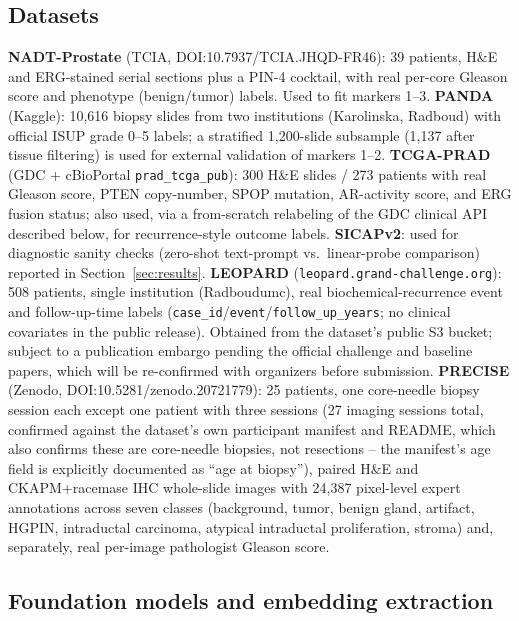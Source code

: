 \subsection{Datasets}

\textbf{NADT-Prostate} (TCIA, DOI:10.7937/TCIA.JHQD-FR46): 39 patients, H\&E and ERG-stained
serial sections plus a PIN-4 cocktail, with real per-core Gleason score and phenotype
(benign/tumor) labels. Used to fit markers 1--3.
\textbf{PANDA} (Kaggle): 10{,}616 biopsy slides from two institutions (Karolinska, Radboud)
with official ISUP grade 0--5 labels; a stratified 1{,}200-slide subsample (1{,}137 after
tissue filtering) is used for external validation of markers 1--2.
\textbf{TCGA-PRAD} (GDC + cBioPortal \texttt{prad\_tcga\_pub}): 300 H\&E slides / 273 patients
with real Gleason score, PTEN copy-number, SPOP mutation, AR-activity score, and ERG fusion
status; also used, via a from-scratch relabeling of the GDC clinical API described below, for
recurrence-style outcome labels.
\textbf{SICAPv2}: used for diagnostic sanity checks (zero-shot text-prompt vs.\ linear-probe
comparison) reported in Section~\ref{sec:results}.
\textbf{LEOPARD} (\texttt{leopard.grand-challenge.org}): 508 patients, single institution
(Radboudumc), real biochemical-recurrence event and follow-up-time labels
(\texttt{case\_id}/\texttt{event}/\texttt{follow\_up\_years}; no clinical covariates in the
public release). Obtained from the dataset's public S3 bucket; subject to a publication
embargo pending the official challenge and baseline papers, which will be re-confirmed with
organizers before submission.
\textbf{PRECISE} (Zenodo, DOI:10.5281/zenodo.20721779): 25 patients, one core-needle biopsy
session each except one patient with three sessions (27 imaging sessions total, confirmed
against the dataset's own participant manifest and README, which also confirms these are
core-needle biopsies, not resections -- the manifest's age field is explicitly documented as
``age at biopsy''), paired H\&E and CKAPM+racemase IHC whole-slide images with 24{,}387
pixel-level expert annotations across seven classes (background, tumor, benign gland, artifact,
HGPIN, intraductal carcinoma, atypical intraductal proliferation, stroma) and, separately, real
per-image pathologist Gleason score.

\subsection{Foundation models and embedding extraction}

